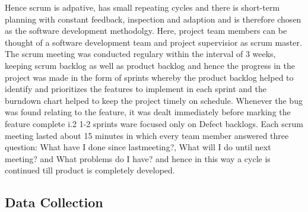 Hence scrum is adpative, has small repeating cycles and there is short-term planning with constant feedback, inspection and adaption and is therefore chosen as the software development methodolgy. Here, project team members can be thought of a software development team and project supervisior as scrum master. The scrum meeting was conducted regulary within the interval of 3 weeks, keeping scrum backlog as well as product backlog and hence the progress in the project was made in the form of sprints whereby the product backlog helped to identify and prioritizes the features to implement in each sprint and the burndown chart helped to keep the project timely on schedule. Whenever the bug was found relating to the feature, it was dealt immediately before marking the feature complete i.2 1-2 sprints ware focused only on Defect backlogs. Each scrum meeting lasted about 15 minutes in which every team member answered three question: What have I done since lastmeeting?, What will I do until next meeting? and What problems do I have? and hence in this way a cycle is continued till product is completely developed.


\subsection{Data Collection}



